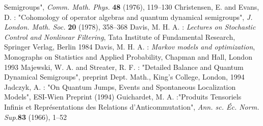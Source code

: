 \documentclass[12pt]{article}
\begin{document}
\begin{thebibliography}{99}
Semigroups", {\sl Comm. Math. Phys. }{\bf 48} (1976), 119--130
 Christensen,  E.  and Evans,  D. : "Cohomology of
operator algebras and quantum dynamical semigroups",  {\sl J.  London.
Math.  Soc. }  {\bf 20} (1978), 358--368
 Davis, M. H. A. : {\sl Lectures on Stochastic Control
and Nonlinear Filtering}, Tata Institute of Fundamental Research, Springer
Verlag, Berlin 1984
 Davis, M. H. A. : {\sl Markov models and optimization},
Monographs on Statistics and Applied Probability,  Chapman and Hall,
London 1993
 Majewski, W. A. and Streater, R. F. : "Detailed
Balance and Quantum Dynamical Semigroups", preprint Dept. Math., King's
College, London, 1994
 Jadczyk, A. : "On Quantum Jumps, Events and Spontaneous
Localization Models", ESI-Wien  Preprint (1994)
 Guichardet, M. A. :"Produits Tensoriels Infinis et
Repr\'esentations des Relations d'Anticommutation", {\sl Ann. sc. \'Ec.
Norm. Sup.}{\bf 83} (1966), 1--52
\end{thebibliography}
\end{document}
